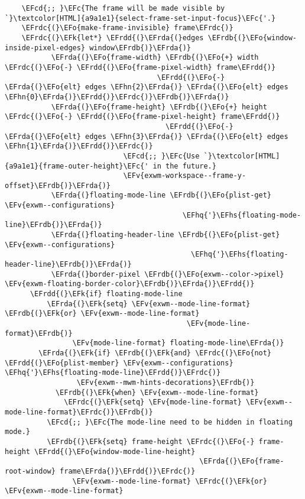 \documentclass[a4wide,10pt]{article}
\newcommand{\EFc}[1]{\textcolor{EFc}{#1}} %
\newcommand{\EFcd}[1]{\textcolor{EFcd}{#1}} %
\newcommand{\EFk}[1]{\textcolor{EFk}{#1}} %
\newcommand{\EFv}[1]{\textcolor{EFv}{#1}} %
\newcommand{\EFo}[1]{\textcolor{EFo}{#1}} %
\newcommand{\EFhn}[1]{\textcolor{EFhn}{\textbf{#1}}} %
\newcommand{\EFhq}[1]{\textcolor{EFhq}{#1}} %
\newcommand{\EFhs}[1]{\textcolor{EFhs}{#1}} %
\newcommand{\EFrda}[1]{\textcolor{EFrda}{#1}} %
\newcommand{\EFrdb}[1]{\textcolor{EFrdb}{#1}} %
\newcommand{\EFrdc}[1]{\textcolor{EFrdc}{#1}} %
\newcommand{\EFrdd}[1]{\textcolor{EFrdd}{#1}} %
\begin{document}
\begin{Code}
\begin{Verbatim}
    \EFcd{;; }\EFc{The frame will be made visible by `}\textcolor[HTML]{a9a1e1}{select-frame-set-input-focus}\EFc{'.}
    \EFrdc{(}\EFo{make-frame-invisible} frame\EFrdc{)}
    \EFrdc{(}\EFk{let*} \EFrdd{(}\EFrda{(}edges \EFrdb{(}\EFo{window-inside-pixel-edges} window\EFrdb{)}\EFrda{)}
           \EFrda{(}\EFo{frame-width} \EFrdb{(}\EFo{+} width \EFrdc{(}\EFo{-} \EFrdd{(}\EFo{frame-pixel-width} frame\EFrdd{)}
                                    \EFrdd{(}\EFo{-} \EFrda{(}\EFo{elt} edges \EFhn{2}\EFrda{)} \EFrda{(}\EFo{elt} edges \EFhn{0}\EFrda{)}\EFrdd{)}\EFrdc{)}\EFrdb{)}\EFrda{)}
           \EFrda{(}\EFo{frame-height} \EFrdb{(}\EFo{+} height \EFrdc{(}\EFo{-} \EFrdd{(}\EFo{frame-pixel-height} frame\EFrdd{)}
                                      \EFrdd{(}\EFo{-} \EFrda{(}\EFo{elt} edges \EFhn{3}\EFrda{)} \EFrda{(}\EFo{elt} edges \EFhn{1}\EFrda{)}\EFrdd{)}\EFrdc{)}
                            \EFcd{;; }\EFc{Use `}\textcolor[HTML]{a9a1e1}{frame-outer-height}\EFc{' in the future.}
                            \EFv{exwm-workspace--frame-y-offset}\EFrdb{)}\EFrda{)}
           \EFrda{(}floating-mode-line \EFrdb{(}\EFo{plist-get} \EFv{exwm--configurations}
                                          \EFhq{'}\EFhs{floating-mode-line}\EFrdb{)}\EFrda{)}
           \EFrda{(}floating-header-line \EFrdb{(}\EFo{plist-get} \EFv{exwm--configurations}
                                            \EFhq{'}\EFhs{floating-header-line}\EFrdb{)}\EFrda{)}
           \EFrda{(}border-pixel \EFrdb{(}\EFo{exwm--color->pixel} \EFv{exwm-floating-border-color}\EFrdb{)}\EFrda{)}\EFrdd{)}
      \EFrdd{(}\EFk{if} floating-mode-line
          \EFrda{(}\EFk{setq} \EFv{exwm--mode-line-format} \EFrdb{(}\EFk{or} \EFv{exwm--mode-line-format}
                                           \EFv{mode-line-format}\EFrdb{)}
                \EFv{mode-line-format} floating-mode-line\EFrda{)}
        \EFrda{(}\EFk{if} \EFrdb{(}\EFk{and} \EFrdc{(}\EFo{not} \EFrdd{(}\EFo{plist-member} \EFv{exwm--configurations} \EFhq{'}\EFhs{floating-mode-line}\EFrdd{)}\EFrdc{)}
                 \EFv{exwm--mwm-hints-decorations}\EFrdb{)}
            \EFrdb{(}\EFk{when} \EFv{exwm--mode-line-format}
              \EFrdc{(}\EFk{setq} \EFv{mode-line-format} \EFv{exwm--mode-line-format}\EFrdc{)}\EFrdb{)}
          \EFcd{;; }\EFc{The mode-line need to be hidden in floating mode.}
          \EFrdb{(}\EFk{setq} frame-height \EFrdc{(}\EFo{-} frame-height \EFrdd{(}\EFo{window-mode-line-height}
                                              \EFrda{(}\EFo{frame-root-window} frame\EFrda{)}\EFrdd{)}\EFrdc{)}
                \EFv{exwm--mode-line-format} \EFrdc{(}\EFk{or} \EFv{exwm--mode-line-format}

\end{Verbatim}
\end{Code}
\end{document}
